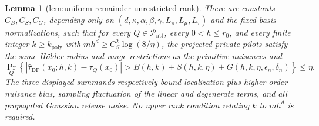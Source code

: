 \documentclass{article}
\newtheorem{lemma}{Lemma}
\begin{document}
\begin{lemma}[lem:uniform-remainder-unrestricted-rank]\label{lem:uniform-remainder-unrestricted-rank}
There are constants \(C_B,C_S,C_G\), depending only on \((d,\kappa,\alpha,\beta,\gamma,L_\pi,L_\mu,L_\tau)\) and the fixed basis normalizations, such that for every \(Q\in\mathcal P_{\mathrm{att}}\), every \(0<h\le r_0\), and every finite integer \(k\ge k_{\mathrm{poly}}\) with \(m h^d\ge C_S^2\log(8/\eta)\), the projected private pilots satisfy the same H\"older-radius and range restrictions as the primitive nuisances and
\[
 \Pr_Q\!\left\{\left|\widehat\tau_{\mathrm{DP}}(x_0;h,k)-\tau_Q(x_0)\right|>
 B(h,k)+S(h,k,\eta)+G(h,k,\eta,\epsilon_n,\delta_n)\right\}\le\eta.
\]
The three displayed summands respectively bound localization plus higher-order nuisance bias, sampling fluctuation of the linear and degenerate terms, and all propagated Gaussian release noise.  No upper rank condition relating \(k\) to \(m h^d\) is required.
\end{lemma}
\end{document}
